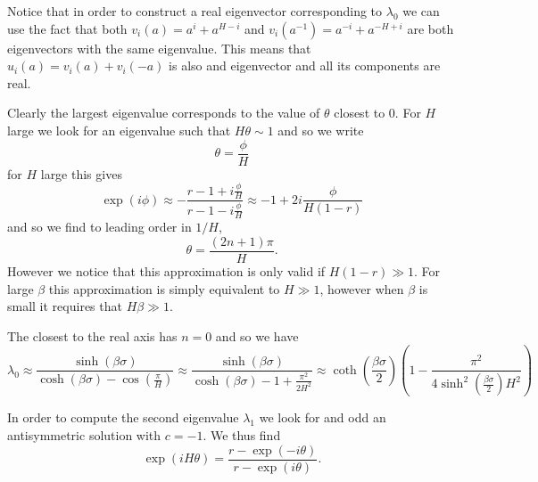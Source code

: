 Notice that in order to construct a real eigenvector corresponding to $\lambda_0$ we can use the fact that both $v_i(a) = a^i + a^{H-i}$ and $v_i(a^{-1}) = a^{-i} + a^{-H+i}$ are both eigenvectors with the same eigenvalue. This means that $u_i(a) = v_i(a) + v_i(-a)$ is also 
and eigenvector and all its components are real. 


Clearly the largest eigenvalue corresponds to the value of $\theta$ closest to $0$.
For $H$ large we look for an eigenvalue such that $H \theta \sim 1$ and so we write
\begin{equation}
\theta = \frac{\phi}{H}
\end{equation}
for $H$ large this gives
\begin{equation}
\exp(i\phi) \approx -\frac{r-1+ i\frac{\phi}{H}}{ r-1- i\frac{\phi}{H}}\approx -1 +2 i\frac{\phi}{H(1-r)}
\end{equation}
and so we find to leading order in $1/H$, 
\begin{equation}
\theta = \frac{(2n+1)\pi}{H}.
\end{equation}
However we notice that this approximation is only valid if $H(1-r) \gg1$. For large $\beta$ this approximation is simply equivalent to $H\gg1$, however when $\beta$ is small it requires
that $H\beta \gg1$.

The closest to the real axis has $n=0$ and so we have
\begin{equation}
\lambda_0 \approx \frac{\sinh(\beta\sigma)}{\cosh(\beta\sigma) - \cos(\frac{\pi}{H})} \approx \frac{\sinh(\beta\sigma)}{\cosh(\beta\sigma) - 1+ \frac{\pi^2}{2H^2}} \approx \coth(\frac{\beta\sigma}{2})(1 - \frac{\pi^2}{4\sinh^2(\frac{\beta\sigma}{2}) H^2})
\end{equation}

In order to compute the second eigenvalue $\lambda_1$ we look for and odd an antisymmetric solution with $c=-1$. We thus find
\begin{equation}
\exp(iH\theta) = \frac{r-\exp(-i\theta)}{r-\exp(i\theta)}.\label{theta}
\end{equation}

